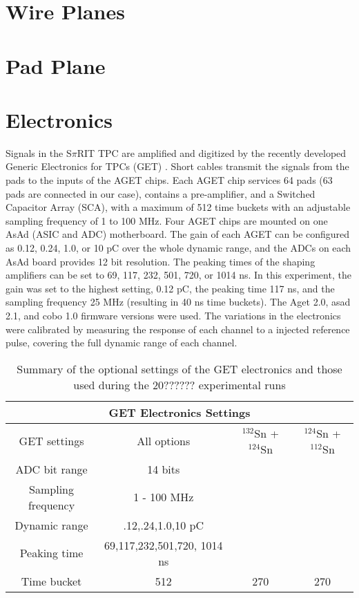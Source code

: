 \section{Wire Planes}



\section{Pad Plane}

\section{Electronics}

Signals in the S$\pi$RIT TPC are amplified and digitized by the recently developed Generic Electronics for TPCs (GET) \cite{get}.  Short cables transmit the signals from the pads to the inputs of the AGET chips. Each AGET chip services 64 pads (63 pads are connected in our case), contains a pre-amplifier, and a Switched Capacitor Array (SCA), with a maximum of 512 time buckets with an adjustable sampling frequency of 1 to 100 MHz. Four AGET chips are mounted on one AsAd (ASIC and ADC) motherboard. The gain of each AGET can be configured as 0.12, 0.24, 1.0, or 10 pC over the whole dynamic range, and the ADCs on each AsAd board provides 12 bit resolution. The peaking times of the shaping amplifiers can be set to 69, 117, 232, 501, 720, or 1014 ns. In this experiment, the gain was set to the highest setting, 0.12 pC, the peaking time 117 ns, and the sampling frequency 25 MHz (resulting in 40 ns time buckets). The Aget 2.0, asad 2.1, and cobo 1.0 firmware versions were used. The variations in the electronics were calibrated by measuring the response of each channel to a injected reference pulse, covering the full dynamic range of each channel. 

\begin{table}
 \begin{tabular}{||c c c c||} 
 \hline
 \multicolumn{4}{|c|}{GET Electronics Settings} \\
 \hline
 GET settings & All options & ${}^{132}$Sn + ${}^{124}$Sn & ${}^{124}$Sn + ${}^{112}$Sn \\
 \hline
 ADC bit range      & 14 bits &  &  \\
 \hline
 Sampling frequency & 1 - 100 MHz &   &    \\
 \hline
 Dynamic range      & .12,.24,1.0,10 pC & & \\
 \hline
 Peaking time       &  69,117,232,501,720, 1014 ns &  &   \\
 \hline
 Time bucket        & 512 & 270 & 270  \\
 \hline
\end{tabular}
\caption{Summary of the optional settings of the GET electronics and those used during the 20?????? experimental runs}
\label{tb:spiritoverview}
\end{table}


